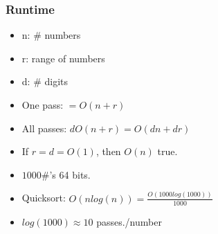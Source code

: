 \subsubsection{Runtime}
\begin{definition}
    \begin{itemize}
        \item n: \# numbers 
        \item r: range of numbers 
        \item d: \# digits
        \item One pass: $=O(n+r)$
        \item All passes: $dO(n+r) = O(dn + dr)$
        \item If $r=d=O(1)$, then $O(n)$ true.
        \item $1000\#$'s 64 bits. 
        \item Quicksort: $O(nlog(n)) = \frac{O(1000log(1000))}{1000}$
        \item $log(1000) \approx 10$ passes./number
    \end{itemize}
\end{definition}